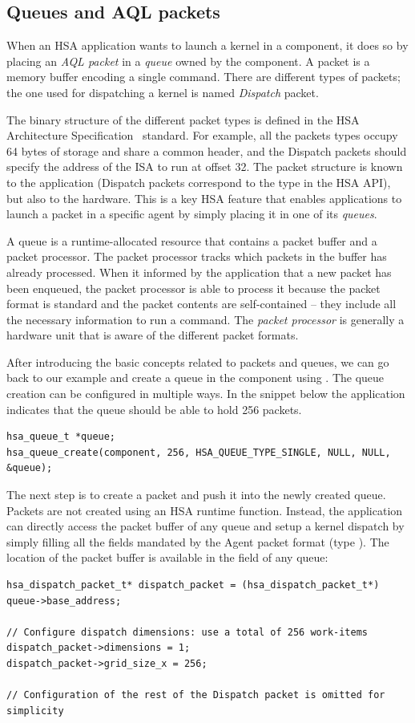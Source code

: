 \documentclass[final]{book}
\begin{document}
\subsection{Queues and AQL packets}
When an HSA application wants to launch a kernel in a component, it does so by
placing an \textit{AQL packet} in a \textit{queue} owned by the component. A
packet is a memory buffer encoding a single command. There are different types
of packets; the one used for dispatching a kernel is named \emph{Dispatch}
packet.

The binary structure of the different packet types is defined in the HSA
Architecture Specification~\cite{sar} standard. For example, all the packets
types occupy 64 bytes of storage and share a common header, and the Dispatch
packets should specify the address of the ISA to run at offset 32. The packet
structure is known to the application (Dispatch packets correspond to the
 type in the HSA API), but also to the
hardware. This is a key HSA feature that enables applications to launch a packet
in a specific agent by simply placing it in one of its \textit{queues}.

A queue is a runtime-allocated resource that contains a packet buffer and a
packet processor. The packet processor tracks which packets in the buffer has
already processed. When it informed by the application that a new packet has
been enqueued, the packet processor is able to process it because the packet
format is standard and the packet contents are self-contained -- they include
all the necessary information to run a command. The \textit{packet processor} is
generally a hardware unit that is aware of the different packet formats.

After introducing the basic concepts related to packets and queues, we can go
back to our example and create a queue in the component using
. The queue creation can be configured in multiple
ways. In the snippet below the application indicates that the queue should
be able to hold 256 packets.
\begin{lstlisting}
hsa_queue_t *queue;
hsa_queue_create(component, 256, HSA_QUEUE_TYPE_SINGLE, NULL, NULL, &queue);
\end{lstlisting}

The next step is to create a packet and push it into the newly created
queue. Packets are not created using an HSA runtime function. Instead, the
application can directly access the packet buffer of any queue and setup a
kernel dispatch by simply filling all the fields mandated by the Agent packet
format (type ). The location of the packet buffer
is available in the  field of any queue:
\begin{lstlisting}
hsa_dispatch_packet_t* dispatch_packet = (hsa_dispatch_packet_t*) queue->base_address;

// Configure dispatch dimensions: use a total of 256 work-items
dispatch_packet->dimensions = 1;
dispatch_packet->grid_size_x = 256;

// Configuration of the rest of the Dispatch packet is omitted for simplicity
\end{lstlisting}
\end{document}
